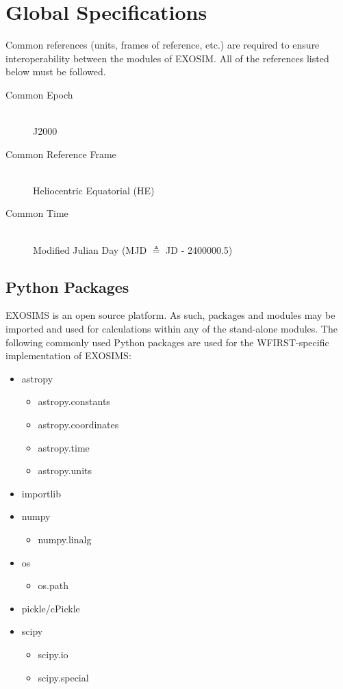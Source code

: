 \documentclass[cleanfoot]{asme2ej}
\begin{document}

\section{Global Specifications}
Common references (units, frames of reference, etc.) are required to ensure interoperability between the modules of EXOSIM.  All of the references listed below must be followed.

\begin{description}
    \item[Common Epoch] \hfill \\ J2000
    \item[Common Reference Frame] \hfill \\ Heliocentric Equatorial (HE)
    \item[Common Time] \hfill \\ Modified Julian Day (MJD $\triangleq$ JD - 2400000.5)
\end{description}

\subsection{Python Packages} 
EXOSIMS is an open source platform.  As such, packages and modules may be imported and used for calculations within any of the stand-alone modules.  The following commonly used Python packages are used for the WFIRST-specific implementation of EXOSIMS:

\begin{itemize}
    \item astropy
        \begin{itemize}
            \item astropy.constants
            \item astropy.coordinates
            \item astropy.time
            \item astropy.units
        \end{itemize}
    \item importlib
    \item numpy
        \begin{itemize}
            \item numpy.linalg 
        \end{itemize}
    \item os
        \begin{itemize}
            \item os.path 
        \end{itemize}
    \item pickle/cPickle
    \item scipy
        \begin{itemize}
            \item scipy.io
            \item scipy.special
        \end{itemize}
\end{itemize}
\end{document}
